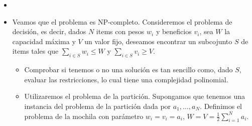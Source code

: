 \documentclass[twoside]{article}
\begin{document}
\begin{solucion}
\begin{itemize}
\item[]
\item Veamos que el problema es NP-completo. Consideremos el problema de decisión, es decir, dados $N$ items con pesos $w_i$ y beneficios $v_i$, sea $W$ la capacidad máxima y $V$ un valor fijo, deseamos encontrar un subcojunto $S$ de items tales que $\sum_{i\in S}w_i \leq W$ y $\sum_{i \in S}v_i \geq V$.
\begin{itemize}
\item Comprobar si tenemos o no una solución es tan sencillo como, dado $S$, evaluar las restricciones, lo cual tiene una complejidad polinomial.
\item Utilizaremos el problema de la partición. Supongamos que tenemos una instancia del problema de la partición dada por $a_1,\dotsc,a_N$. Definimos el problema de la mochila con parámetro $w_i = v_i = a_i$, $W=V = \frac{1}{2}\sum_{i=1}^N a_i$. 


\end{itemize}
\end{itemize}
\end{solucion}
\end{document}
